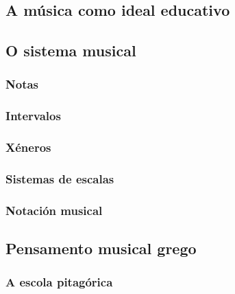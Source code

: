 \documentclass[a4paper, twoside]{templates/ociamthesis}
\begin{document}
\hypertarget{a-muxfasica-como-ideal-educativo}{%
\subsection{A música como ideal educativo}\label{a-muxfasica-como-ideal-educativo}}

\hypertarget{o-sistema-musical}{%
\subsection{O sistema musical}\label{o-sistema-musical}}

\hypertarget{notas}{%
\subsubsection{Notas}\label{notas}}

\hypertarget{intervalos}{%
\subsubsection{Intervalos}\label{intervalos}}

\hypertarget{xuxe9neros}{%
\subsubsection{Xéneros}\label{xuxe9neros}}

\hypertarget{sistemas-de-escalas}{%
\subsubsection{Sistemas de escalas}\label{sistemas-de-escalas}}

\hypertarget{notaciuxf3n-musical}{%
\subsubsection{Notación musical}\label{notaciuxf3n-musical}}

\hypertarget{pensamento-musical-grego}{%
\subsection{Pensamento musical grego}\label{pensamento-musical-grego}}

\hypertarget{a-escola-pitaguxf3rica}{%
\subsubsection{A escola pitagórica}\label{a-escola-pitaguxf3rica}}
\end{document}
